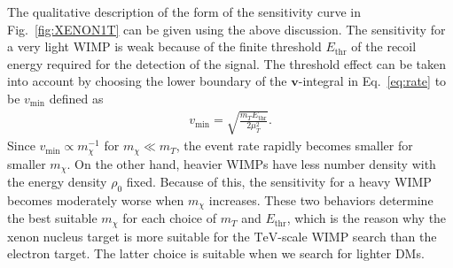 \documentclass[12pt,twoside,book]{article}
\begin{document}
The qualitative description of the form of the sensitivity curve in Fig.~\ref{fig:XENON1T} can be given using the above discussion.
The sensitivity for a very light WIMP is weak because of the finite threshold $E_{\mathrm{thr}}$ of the recoil energy required for the detection of the signal.
The threshold effect can be taken into account by choosing the lower boundary of the $\bm{v}$-integral in Eq.~\eqref{eq:rate} to be $v_{\mathrm{min}}$ defined as
\begin{align}
  v_{\mathrm{min}} = \sqrt{\frac{m_T E_{\mathrm{thr}}}{2 \mu_T^2}}.
\end{align}
Since $v_{\mathrm{min}} \propto m_\chi^{-1}$ for $m_\chi \ll m_T$, the event rate rapidly becomes smaller for smaller $m_\chi$.
On the other hand, heavier WIMPs have less number density with the energy density $\rho_0$ fixed.
Because of this, the sensitivity for a heavy WIMP becomes moderately worse when $m_\chi$ increases.
These two behaviors determine the best suitable $m_\chi$ for each choice of $m_T$ and $E_{\mathrm{thr}}$, which is the reason why the xenon nucleus target is more suitable for the $\mathrm{TeV}$-scale WIMP search than the electron target.
The latter choice is suitable when we search for lighter DMs.
\end{document}
